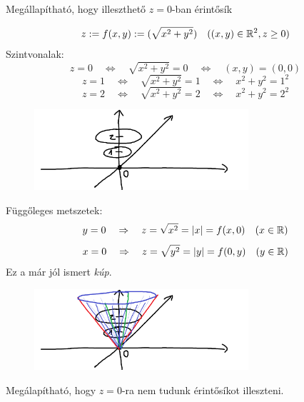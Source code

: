\documentclass[a4paper,11.5pt]{article}
\begin{document}
	\begin{note}
		Megállapítható, hogy illeszthető $z=0$-ban érintősík 
	\end{note}
	\begin{task}
		\[ z:=f(x,y):=(\sqrt{x^2+y^2})\quad ((x,y)\in\mathbb{R}^2, z\geq 0) \]
		Szintvonalak:
		\[ z=0\quad \Leftrightarrow\quad \sqrt{x^2+y^2}=0\quad \Leftrightarrow\quad (x,y)=(0,0) \]
		\[ z=1\quad \Leftrightarrow\quad \sqrt{x^2+y^2}=1\quad \Leftrightarrow\quad x^2+y^2=1^2 \]
		\[ z=2\quad \Leftrightarrow\quad \sqrt{x^2+y^2}=2\quad \Leftrightarrow\quad x^2+y^2=2^2 \]
		\begin{figure}[H]
			\centering
			\includegraphics[height=3cm]{kepek/03.png}
			\caption{}
		\end{figure}
		Függőleges metszetek:
		\[ y=0\quad \Rightarrow\quad z=\sqrt{x^2}=|x|=f(x,0)\quad (x\in\mathbb{R}) \]
		\[ x=0\quad \Rightarrow\quad z=\sqrt{y^2}=|y|=f(0,y)\quad (y\in\mathbb{R}) \]
		Ez a már jól ismert \textit{kúp}.
		\begin{figure}[H]
			\centering
			\includegraphics[height=3cm]{kepek/04.png}
			\caption{}
		\end{figure}
	\end{task}
	\begin{note}
		Megálapítható, hogy $z=0$-ra nem tudunk érintősíkot illeszteni.
	\end{note}
\end{document}
